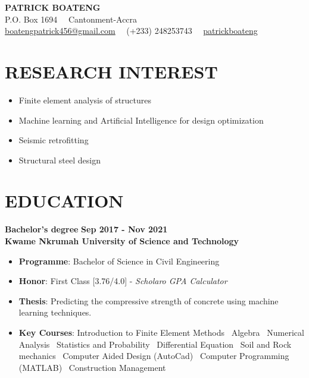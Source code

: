 \documentclass[letterpaper, 12pt]{article}
\newcommand{\cvsection}[1]{
	
	\section*{#1}
}
\newcommand{\verticalSpace}{4pt}
\begin{document}
	
	
	\begin{center}
		
	{\huge{\textbf{PATRICK BOATENG}}} \\ [\verticalSpace]
	
	P.O. Box 1694 \, \vrule \, Cantonment-Accra \\ [\verticalSpace]
	
	\faEnvelope \space \href{mailto:boatengpatrick456@gmail.com}{\underline{boatengpatrick456@gmail.com}}
	\, \vrule \,
	\faPhone \space (+233) 248253743
	\, \vrule \,
	 \faGithub \space \href{https://www.github.com/patrickboateng}{\underline{patrickboateng}}
	
	\end{center}
	
	
	\cvsection{RESEARCH INTEREST}
	
	\begin{itemize}[leftmargin=*]
		
		\item Finite element analysis of structures
		\item Machine learning and Artificial Intelligence for design optimization
		\item Seismic retrofitting
		\item Structural steel design
		
	\end{itemize}
	
	
	\cvsection{EDUCATION} 	
	
	\textbf{Bachelor's degree} \hfill \textbf{Sep 2017 - Nov 2021} \\ [\verticalSpace]
	\textbf{Kwame Nkrumah University of Science and Technology}
	
	\begin{itemize}[leftmargin=*]
		
		\item \textbf{Programme}: Bachelor of Science in Civil Engineering
		\item \textbf{Honor}: First Class [3.76/4.0] - \textit{Scholaro GPA Calculator}
		\item \textbf{Thesis}: Predicting the compressive strength of concrete using machine learning techniques.
		\item \textbf{Key Courses}: Introduction to Finite Element Methods \vrule \, Algebra \vrule \, Numerical Analysis \vrule \, Statistics and Probability \vrule \, Differential Equation \vrule \, Soil and Rock mechanics \vrule \, Computer Aided Design (AutoCad) \vrule \, Computer Programming (MATLAB) \vrule \, Construction Management
	
	\end{itemize}
	
\end{document}
